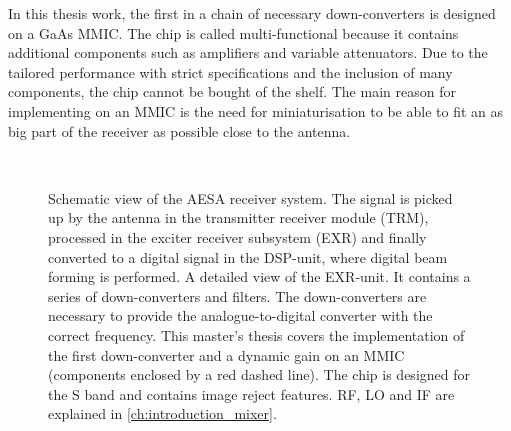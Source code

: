 		In this thesis work, the first in a chain of necessary down-converters is designed on a GaAs MMIC. The chip is called multi-functional because it contains additional components such as amplifiers and variable attenuators. Due to the tailored performance with strict specifications and the inclusion of many components, the chip cannot be bought of the shelf. The main reason for implementing on an MMIC is the need for miniaturisation to be able to fit an as  big part of the receiver as possible close to the antenna.
		
		\begin{figure}[hpt!]
			\centering 
			\\
			\caption[AESA receiver system.]{Schematic view of the AESA receiver system.  The signal is picked up by the antenna in the transmitter receiver module (TRM), processed in the exciter receiver subsystem (EXR) and finally converted to a digital signal in the DSP-unit, where digital beam forming is performed.  A detailed view of the EXR-unit. It contains a series of down-converters and filters. The down-converters are necessary to provide the analogue-to-digital converter with the correct frequency. This master's thesis covers the implementation of the first down-converter and a dynamic gain on an MMIC (components enclosed by a red dashed line). The chip is designed for the S band and contains image reject features. RF, LO and IF are explained in  \ref{ch:introduction_mixer}.}\label{fig:intro_fig}
		\end{figure}
		
		
